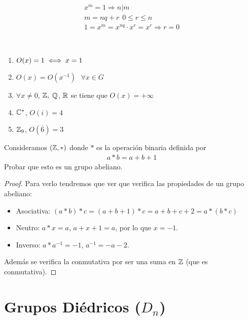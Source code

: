 \begin{observacion}
    \begin{gather*}
        x^m = 1 \Rightarrow n|m\\
        m=nq +r \ \ 0\leq r \leq n\\
        1 = x^m = x^{nq} \cdot x^r = x^r \Rightarrow r=0
    \end{gather*}
\end{observacion}

\begin{ejemplo}\
    \begin{enumerate}
        \item $O(x)=1 \iff x=1$
        \item $O(x)=O(x^{-1})\ \ \ \forall x \in G$
        \item $\forall x \neq 0$, $\mathbb{Z},$ $\mathbb{Q}$, $\mathbb{R}$ se tiene que $O(x)=+\infty$
        \item $\mathbb{C}^\ast$, $O(i)=4$
        \item $\mathbb{Z}_9$, $O(\overline{6})=3$
    \end{enumerate}
\end{ejemplo}

\begin{ejercicio}
    Consideramos $(\mathbb{Z}, \ast)$ donde $\ast$ es la operación binaria definida por
    \begin{align*}
        a\ast b = a+b+1
    \end{align*}
    Probar que esto es un grupo abeliano.
    \begin{proof}
        Para verlo tendremos que ver que verifica las propiedades de un grupo abeliano:
        \begin{itemize}
            \item Asociativa: $(a\ast b) \ast c = (a+b+1)\ast c = a+b+c+2 = a\ast (b \ast c)$ 
            \item Neutro: $a\ast x = a$, $a+x+1 = a$, por lo que $x=-1$.
            \item Inverso: $a \ast a^{-1}=-1$, $a^{-1} = -a-2$.
        \end{itemize}
        Además se verifica la conmutativa por ser una suma en $\mathbb{Z}$ (que es conmutativa).
    \end{proof}
\end{ejercicio}

\section{Grupos Diédricos ($D_n$)}

